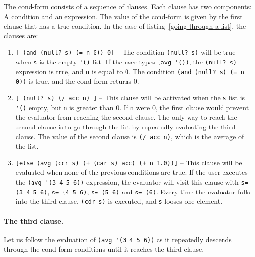\documentclass[a4paper,12pt]{book}
\begin{document}
The cond-form consists of a sequence
of clauses. Each clause has two components:
A condition and an expression. The value of the
cond-form is given by the first
clause that has a true condition.
In the case of listing~\ref{going-through-a-list},
the clauses are:
\begin{enumerate}
\item \verb|[ (and (null? s) (= n 0)) 0]| --
The condition \verb|(null? s)| will be true
when \verb|s| is the empty \verb|'()| list.
If the user types \verb|(avg '())|,
the \verb|(null? s)| expression is true, and \verb|n| is
equal to 0. The condition
\verb|(and (null? s) (= n 0))| is true, and the cond-form
returns 0.
\item \verb|[ (null? s) (/ acc n) ]| -- This clause
will be activated when the \verb|s| list is
\verb|'()| empty, but \verb|n| is greater than
0. If \verb|n| were 0, the first clause
would prevent the evaluator from
reaching the second clause. The only
way to reach the second clause is to go through
the list by repeatedly evaluating the third clause.
The value of the second clause is \verb|(/ acc n)|,
which is the average of the list.
\item \verb|[else (avg (cdr s) (+ (car s) acc) (+ n 1.0))]| --
This clause will be evaluated
when none of the previous conditions are true.
If the user executes the \verb|(avg '(3 4 5 6))|
expression, the evaluator will visit this
clause with \verb|s= (3 4 5 6)|, \verb|s= (4 5 6)|,
\verb|s= (5 6)| and \verb|s= (6)|.
Every time the evaluator falls into the third
clause, \verb|(cdr s)| is executed, and \verb|s|
looses one element.
\end{enumerate}

\paragraph{The third clause.}
Let us follow the evaluation of \verb|(avg '(3 4 5 6))|
as it repeatedly  descends through the cond-form conditions
until it reaches the third clause.
\end{document}
